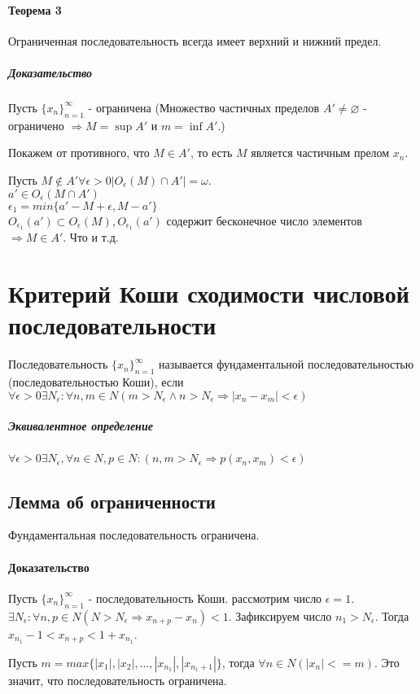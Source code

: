 \documentclass[10pt]{article}
\newcommand{\seq}[2]{ \{#1_{#2}\}_{#2=1}^\infty}
\newcommand{\seqn}[1]{\seq{#1}{n}}
\begin{document}
			\paragraph{Теорема 3}
			Ограниченная последовательность всегда имеет верхний и нижний предел.
			\subparagraph{Доказательство}
			Пусть $\seqn{x}$ - ограничена (Множество частичных пределов $A' \neq \varnothing$ - ограничено $\Rightarrow M = \sup A'$ и $m = \inf A'$.)
			
			Покажем от противного, что $M \in A'$, то есть $M$ является частичным прелом $x_n$.
			
			Пусть $M \notin A' \forall \epsilon > 0 |O_\epsilon(M) \cap A'| = \omega$.\\
			$a' \in O_\epsilon(M \cap A')$\\
			$\epsilon_1 = min\{a' - M + \epsilon, M - a'\}$\\
			$O_{\epsilon_1}(a') \subset O_\epsilon(M), O_{\epsilon_1}(a')$ содержит бесконечное число элементов $ \Rightarrow M \in A'$. Что и т.д.
	\section{Критерий Коши сходимости числовой последовательности}
		 Последовательность $\seqn{x}$ называется фундаментальной последовательностью (последовательностью Коши), если $\forall \epsilon > 0 \exists N_\epsilon : \forall n, m \in N (m > N_\epsilon \wedge n > N_\epsilon \Rightarrow |x_n - x_m| < \epsilon)$ 

		\subparagraph{Эквивалентное определение} $\forall \epsilon > 0 \exists N_\epsilon, \forall n \in N, p \in N : (n,m > N_\epsilon \Rightarrow p(x_n, x_m) < \epsilon) $

		\subsection{Лемма об ограниченности} Фундаментальная последовательность ограничена.
		\paragraph{Доказательство}
		Пусть $\seqn{x}$ - последовательность Коши. рассмотрим число $\epsilon = 1$. $\exists N_\epsilon : \forall n,p \in N (N > N_\epsilon \Rightarrow x_{n+p} - x_n) < 1$. Зафиксируем число $n_1 > N_\epsilon$. Тогда $x_{n_1} - 1 < x_{n+p} < 1 + x_{n_1}$.

		Пусть $m = max\{|x_1|, |x_2|, \dots, |x_{n_1}|, |x_{n_1+1}| \}$, тогда $\forall n \in N (|x_n| <= m)$. Это значит, что последовательность ограничена.
\end{document}

